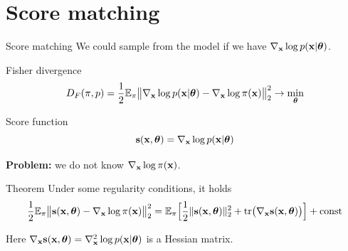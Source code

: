 \section{Score matching}
\begin{frame}{Score matching}
	We could sample from the model if we have $\nabla_{\mathbf{x}}\log p(\mathbf{x}| \boldsymbol{\theta})$.
	\begin{block}{Fisher divergence}
		\vspace{-0.3cm}
		\[
			D_F(\pi, p) = \frac{1}{2}\mathbb{E}_{\pi}\bigl\| \nabla_{\mathbf{x}}\log p(\mathbf{x}| \boldsymbol{\theta}) - \nabla_{\mathbf{x}} \log \pi(\mathbf{x}) \bigr\|^2_2 \rightarrow \min_{\boldsymbol{\theta}}
		\]
		\vspace{-0.5cm}
	\end{block}
	\begin{block}{Score function}
		\vspace{-0.3cm}
		\[
			\mathbf{s}(\mathbf{x}, \boldsymbol{\theta}) = \nabla_{\mathbf{x}}\log p(\mathbf{x}| \boldsymbol{\theta})
		\]
		\vspace{-0.3cm}
	\end{block}
	\textbf{Problem:} we do not know $\nabla_{\mathbf{x}} \log \pi(\mathbf{x})$.
	\begin{block}{Theorem}
		Under some regularity conditions, it holds
		\vspace{-0.2cm}
		\[
			\frac{1}{2} \mathbb{E}_{\pi}\bigl\| \mathbf{s}(\mathbf{x}, \boldsymbol{\theta}) - \nabla_{\mathbf{x}} \log \pi(\mathbf{x}) \bigr\|^2_2 = \mathbb{E}_{\pi}\Bigr[ \frac{1}{2}\| \mathbf{s}(\mathbf{x}, \boldsymbol{\theta}) \|_2^2 + \text{tr}\bigl(\nabla_{\mathbf{x}} \mathbf{s}(\mathbf{x}, \boldsymbol{\theta})\bigr) \Bigr] + \text{const}
		\]
		\vspace{-0.4cm}
	\end{block}
	Here $\nabla_{\mathbf{x}} \mathbf{s}(\mathbf{x}, \boldsymbol{\theta}) = \nabla_{\mathbf{x}}^2 \log p(\mathbf{x} | \boldsymbol{\theta})$ is a Hessian matrix.
\end{frame}

